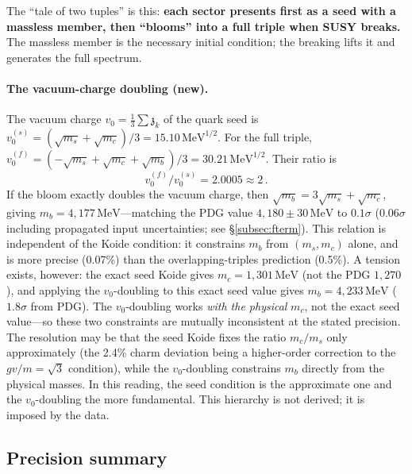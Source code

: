 \documentclass[12pt,a4paper]{article}
\newcommand{\MeV}{\,\text{MeV}}
\newcommand{\zch}{\mathfrak{z}}
\begin{document}
The ``tale of two tuples'' is this: \textbf{each sector presents
first as a seed with a massless member, then ``blooms'' into a
full triple when SUSY breaks.} The massless member is the necessary
initial condition; the breaking lifts it and generates the full spectrum.

\paragraph{The vacuum-charge doubling (new).}
The vacuum charge $v_0 = \tfrac{1}{3}\sum\zch_k$ of the quark seed
is $v_0^{(s)} = (\sqrt{m_s} + \sqrt{m_c})/3 = 15.10\MeV^{1/2}$.
For the full triple, $v_0^{(f)} = (-\sqrt{m_s} + \sqrt{m_c} +
\sqrt{m_b})/3 = 30.21\MeV^{1/2}$. Their ratio is
\begin{equation*}
  v_0^{(f)}/v_0^{(s)} = 2.0005 \approx 2\,.
\end{equation*}
If the bloom exactly doubles the vacuum charge, then
$\sqrt{m_b} = 3\sqrt{m_s} + \sqrt{m_c}$, giving
$m_b = 4{,}177\MeV$---matching the PDG value
$4{,}180 \pm 30\MeV$ to $0.1\sigma$ ($0.06\sigma$ including
propagated input uncertainties; see \S\ref{subsec:fterm}). This relation is
independent of the Koide condition: it constrains $m_b$ from
$(m_s, m_c)$ alone, and is more precise (0.07\%) than the
overlapping-triples prediction (0.5\%).  A tension exists, however:
the exact seed Koide gives $m_c = 1{,}301\MeV$ (not the PDG
$1{,}270$), and applying the $v_0$-doubling to this exact seed
value gives $m_b = 4{,}233\MeV$ ($1.8\sigma$ from PDG). The
$v_0$-doubling works \emph{with the physical} $m_c$, not the exact
seed value---so these two constraints are mutually inconsistent at the
stated precision. The resolution may be that the seed Koide fixes the
ratio $m_c/m_s$ only approximately (the 2.4\% charm deviation being a
higher-order correction to the $gv/m = \sqrt{3}$ condition), while the
$v_0$-doubling constrains $m_b$ directly from the physical masses. In
this reading, the seed condition is the approximate one and the
$v_0$-doubling the more fundamental. This hierarchy is not derived;
it is imposed by the data.

\subsection{Precision summary}
\end{document}
